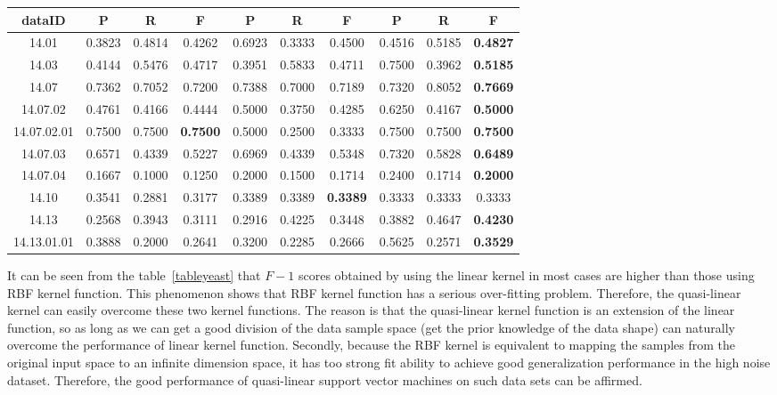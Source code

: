 \documentclass[master]{IPSstyle}
\begin{document}
{\begin{table}[H]
\begin{tabular}{c|ccc|ccc|ccc}
  \\
 dataID & P & R & F & P & R & F  & P & R & F \\
 \hline\hline
14.01 & 0.3823 & 0.4814 & 0.4262 & 0.6923 & 0.3333 & 0.4500  & 0.4516 & 0.5185 & \textbf{0.4827}\\
14.03 & 0.4144 & 0.5476 & 0.4717 & 0.3951 & 0.5833 & 0.4711  & 0.7500 & 0.3962 & \textbf{0.5185}\\
14.07 & 0.7362 & 0.7052 & 0.7200 & 0.7388 & 0.7000 & 0.7189 & 0.7320 & 0.8052 & \textbf{0.7669}\\
14.07.02 & 0.4761 & 0.4166 & 0.4444 & 0.5000 & 0.3750 & 0.4285 & 0.6250 & 0.4167 & \textbf{0.5000}\\
14.07.02.01 & 0.7500 & 0.7500 & \textbf{0.7500} & 0.5000 & 0.2500 & 0.3333 & 0.7500  & 0.7500 & \textbf{0.7500}\\
14.07.03 & 0.6571 & 0.4339 & 0.5227 & 0.6969 & 0.4339 & 0.5348  & 0.7320 & 0.5828 & \textbf{0.6489}\\
14.07.04 & 0.1667 & 0.1000 & 0.1250 & 0.2000 & 0.1500 & 0.1714  & 0.2400 & 0.1714 & \textbf{0.2000}\\
14.10 & 0.3541 & 0.2881 & 0.3177 & 0.3389 & 0.3389 & \textbf{0.3389}  & 0.3333 & 0.3333 & 0.3333\\
14.13 & 0.2568 & 0.3943 & 0.3111 & 0.2916 & 0.4225 & 0.3448  & 0.3882 & 0.4647 & \textbf{0.4230}\\
14.13.01.01 & 0.3888 & 0.2000 & 0.2641 & 0.3200 & 0.2285 & 0.2666 &  0.5625 & 0.2571 & \textbf{0.3529}\\
\hline
\end{tabular}
\end{table}

It can be seen from the table~\ref{tableyeast} that $F-1$ scores obtained by using the linear kernel in most cases are higher than those using RBF kernel function. This phenomenon shows that RBF kernel function has a serious over-fitting problem. Therefore, the quasi-linear kernel can easily overcome these two kernel functions. The reason is that the quasi-linear kernel function is an extension of the linear function, so as long as we can get a good division of the data sample space (get the prior knowledge of the data shape) can naturally overcome the performance of linear kernel function. Secondly, because the RBF kernel is equivalent to mapping the samples from the original input space to an infinite dimension space, it has too strong fit ability to achieve good generalization performance in the high noise dataset. Therefore, the good performance of quasi-linear support vector machines on such data sets can be affirmed.

}
\end{document}
